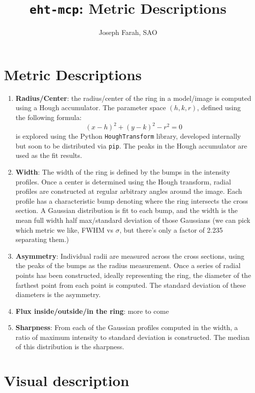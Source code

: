 \documentclass{article}
\title{\texttt{eht-mcp}: Metric Descriptions}
\author{ Joseph Farah, SAO}
\begin{document}
\maketitle


\section{Metric Descriptions}
\begin{enumerate}
	\item \textbf{Radius/Center}: the radius/center of the ring in a model/image is computed using a Hough accumulator. The parameter space $(h, k, r)$, defined using the following formula:
\[ (x-h)^2 + (y-k)^2 - r^2 = 0 \]	
	is explored using the Python \texttt{HoughTransform} library, developed internally but soon to be distributed via \texttt{pip}. The peaks in the Hough accumulator are used as the fit results.
	\item \textbf{Width}: The width of the ring is defined by the bumps in the intensity profiles. Once a center is determined using the Hough transform, radial profiles are constructed at regular arbitrary angles around the image. Each profile has a characteristic bump denoting where the ring intersects the cross section. A Gaussian distribution is fit to each bump, and the width is the mean full width half max/standard deviation of those Gaussians (we can pick which metric we like, FWHM vs $\sigma$, but there's only a factor of 2.235 separating them.)
	\item \textbf{Asymmetry}: Individual radii are measured across the cross sections, using the peaks of the bumps as the radius measurement. Once a series of radial points has been constructed, ideally representing the ring, the diameter of the farthest point from each point is computed. The standard deviation of these diameters is the asymmetry.
	\item \textbf{Flux inside/outside/in the ring}: more to come
	\item \textbf{Sharpness}: From each of the Gaussian profiles computed in the width, a ratio of maximum intensity to standard deviation is constructed. The median of this distribution is the sharpness.
\end{enumerate}

\section{Visual description}
\end{document}
